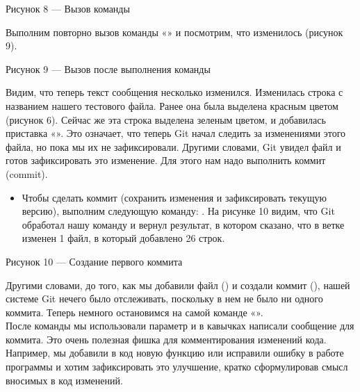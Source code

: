 \documentclass[letterpaper,10pt,russian]{sphinxmanual}
\begin{document}
\sphinxAtStartPar
{}

\sphinxAtStartPar
Рисунок 8 — Вызов команды 

\sphinxAtStartPar
Выполним повторно вызов команды «» и посмотрим, что изменилось (рисунок 9).

\sphinxAtStartPar
{}

\sphinxAtStartPar
Рисунок 9 — Вызов  после выполнения команды 

\sphinxAtStartPar
Видим, что теперь текст сообщения несколько изменился. Изменилась строка с названием нашего тестового файла. Ранее она была выделена красным цветом (рисунок 6). Сейчас же эта строка выделена зеленым цветом, и добавилась приставка «». Это означает, что теперь Git начал следить за изменениями этого файла, но пока мы их не зафиксировали. Другими словами, Git увидел файл и готов зафиксировать это изменение. Для этого нам надо выполнить коммит (commit).
\begin{itemize}
\item {} 
\sphinxAtStartPar
{}
Чтобы сделать коммит (сохранить изменения и зафиксировать текущую версию), выполним следующую команду: .
На рисунке 10 видим, что Git обработал нашу команду и вернул результат, в котором сказано, что в ветке  изменен 1 файл, в который добавлено 26 строк.

\end{itemize}

\sphinxAtStartPar
{}

\sphinxAtStartPar
Рисунок 10 — Создание первого коммита

\sphinxAtStartPar
Другими словами, до того, как мы добавили файл () и создали коммит (), нашей системе Git нечего было отслеживать, поскольку в нем не было ни одного коммита. Теперь немного остановимся на самой команде «».\\
После команды  мы использовали параметр  и в кавычках  написали сообщение для коммита. Это очень полезная фишка для комментирования изменений кода. Например, мы добавили в код новую функцию или исправили ошибку в работе программы и хотим зафиксировать это улучшение, кратко сформулировав смысл вносимых в код изменений.
\end{document}
